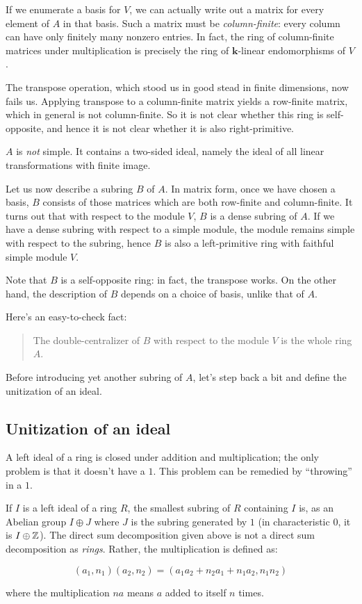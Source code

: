 \documentclass[a4paper]{amsart}
\newcommand{\field}{\mathbf{k}}
\begin{document}
If we enumerate a basis for $V$, we can actually write out a matrix
for every element of $A$ in that basis. Such a matrix must be {\em
  column-finite}: every column can have only finitely many nonzero
entries.  In fact, the ring of column-finite matrices under
multiplication is precisely the ring of $\field$-linear endomorphisms
of $V$.

The transpose operation, which stood us in good stead in finite
dimensions, now fails us. Applying transpose to a column-finite matrix
yields a row-finite matrix, which in general is not column-finite. So
it is not clear whether this ring is self-opposite, and hence it is
not clear whether it is also right-primitive.

$A$ is {\em not} simple. It contains a two-sided ideal, namely the
ideal of all linear transformations with finite image.

Let us now describe a subring $B$ of $A$. In matrix form, once we have
chosen a basis, $B$ consists of those matrices which are both
row-finite and column-finite. It turns out that with respect to the
module $V$, $B$ is a dense subring of $A$. If we have a dense subring
with respect to a simple module, the module remains simple with respect
to the subring, hence $B$ is also a left-primitive ring with faithful simple
module $V$.

Note that $B$ is a self-opposite ring: in fact, the transpose
works. On the other hand, the description of $B$ depends on a choice
of basis, unlike that of $A$.

Here's an easy-to-check fact:

\begin{quote}
  The double-centralizer of $B$ with respect to the module $V$
  is the whole ring $A$.
\end{quote}


Before introducing yet another subring of $A$, let's step back a
bit and define the unitization of an ideal.

\subsection{Unitization of an ideal}

A left ideal of a ring is closed under addition and multiplication;
the only problem is that it doesn't have a $1$. This problem can be remedied
by ``throwing'' in a $1$.

\begin{claimer}
  If $I$ is a left ideal of a ring $R$, the smallest subring of $R$
  containing $I$ is, as an Abelian group $I \oplus J$ where $J$ is the
  subring generated by $1$ (in characteristic $0$, it is $I \oplus
  \mathbb{Z}$). The direct sum decomposition given above is not a direct sum
  decomposition as {\em rings}. Rather, the multiplication is defined as:

  $$(a_1,n_1)(a_2,n_2) = (a_1a_2 + n_2a_1 + n_1a_2, n_1n_2)$$

  where the multiplication $na$ means $a$ added to itself $n$ times.
\end{claimer}
\end{document}
